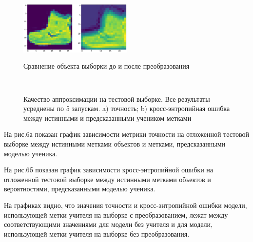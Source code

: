 \begin{figure}[h!t]\center
{\includegraphics[width=0.5\textwidth]{results/dilation}}
\caption{Сравнение объекта выборки до и после преобразования}
\end{figure}

\begin{figure}[h!t]\center
{}
\\
\caption{Качество аппроксимации на тестовой выборке. Все результаты усреднены по 5 запускам. a) точность; b) кросс-энтропийная ошибка между истинными и предсказанными учеником метками}
\end{figure}

На рис.6а показан график зависимости метрики точности на отложенной тестовой выборке между истинными метками объектов и метками, предсказанными моделью ученика.

На рис.6б показан график зависимости кросс-энтропийной ошибки на отложенной тестовой выборке между истинными метками объектов и вероятностями, предсказанными моделью ученика.

На графиках видно, что значения точности и кросс-энтропийной ошибки модели, использующей метки учителя на выборке с преобразованием, лежат между соответствующими значениями для модели без учителя и для модели, использующей метки учителя на выборке без преобразования.

